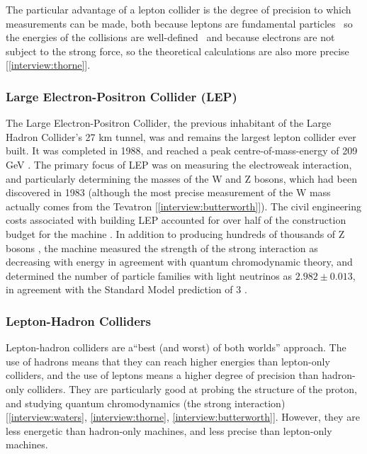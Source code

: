 The particular advantage of a lepton collider is the degree of precision to which measurements can be made, both because leptons are fundamental particles \textemdash \, so the energies of the collisions are well-defined \textemdash \, and because electrons are not subject to the strong force, so the theoretical calculations are also more precise [\ref{interview:thorne}].

\subsubsection{Large Electron-Positron Collider (LEP)}
The Large Electron-Positron Collider, the previous inhabitant of the Large Hadron Collider's 27 km tunnel, was and remains the largest lepton collider ever built. It was completed in 1988, and reached a peak centre-of-mass-energy of 209 GeV \cite{CERN:LEP:Online}. The primary focus of LEP was on measuring the electroweak interaction, and particularly determining the masses of the W and Z bosons, which had been discovered in 1983 (although the most precise measurement of the W mass actually comes from the Tevatron [\ref{interview:butterworth}]). The civil engineering costs associated with building LEP accounted for over half of the construction budget for the machine \cite{LEP:History:Online}. In addition to producing hundreds of thousands of Z bosons \cite{LEP:History:Online}, the machine measured the strength of the strong interaction as decreasing with energy in agreement with quantum chromodynamic theory, and determined the number of particle families with light neutrinos as $2.982\pm 0.013$, in agreement with the Standard Model prediction of 3 \cite{ALEPH:Physics:Online}.

\subsubsection{Lepton-Hadron Colliders}
Lepton-hadron colliders are a``best (and worst) of both worlds'' approach. The use of hadrons means that they can reach higher energies than lepton-only colliders, and the use of leptons means a higher degree of precision than hadron-only colliders. They are particularly good at probing the structure of the proton, and studying quantum chromodynamics (the strong interaction) [\ref{interview:waters}, \ref{interview:thorne}, \ref{interview:butterworth}]. However, they are less energetic than hadron-only machines, and less precise than lepton-only machines.

